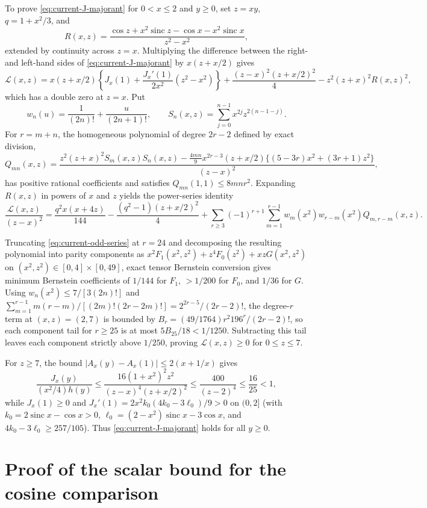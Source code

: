 \documentclass[11pt]{article}
\numberwithin{equation}{section}
\theoremstyle{remark}
\DeclareMathOperator{\sinc}{sinc}
\begin{document}
To prove \eqref{eq:current-J-majorant} for $0<x\le2$ and $y\ge0$, set $z=xy$,
$q=1+x^2/3$, and
\[
 R(x,z)=\frac{\cos z+x^2\sinc z-\cos x-x^2\sinc x}{z^2-x^2},
\]
extended by continuity across $z=x$. Multiplying the difference between the
right- and left-hand sides of \eqref{eq:current-J-majorant} by $x(z+x/2)$ gives
\[
 \mathcal L(x,z)=x(z+x/2)\left\{J_x(1)
       +\frac{J_x'(1)}{2x^2}(z^2-x^2)\right\}
       +\frac{(z-x)^2(z+x/2)^2}{4}
       -z^2(z+x)^2R(x,z)^2,
\]
which has a double zero at $z=x$. Put
\[
 w_n(u)=\frac1{(2n)!}+\frac{u}{(2n+1)!},\qquad
 S_n(x,z)=\sum_{j=0}^{n-1}x^{2j}z^{2(n-1-j)}.
\]
For $r=m+n$, the homogeneous polynomial of degree $2r-2$ defined by exact
division,
\[
 Q_{mn}(x,z)=\frac{
 z^2(z+x)^2S_m(x,z)S_n(x,z)
 -\frac{4mn}{9}x^{2r-3}(z+x/2)
        \{(5-3r)x^2+(3r+1)z^2\}}{(z-x)^2},
\]
has positive rational coefficients and satisfies $Q_{mn}(1,1)\le8mnr^2$.
Expanding $R(x,z)$ in powers of $x$ and $z$ yields the power-series identity
\begin{equation}\label{eq:current-odd-series}
 \frac{\mathcal L(x,z)}{(z-x)^2}
 =\frac{q^2x(x+4z)}{144}
   -\frac{(q^2-1)(z+x/2)^2}{4}
   +\sum_{r\ge3}(-1)^{r+1}
       \sum_{m=1}^{r-1}w_m(x^2)w_{r-m}(x^2)Q_{m,r-m}(x,z).
\end{equation}

Truncating \eqref{eq:current-odd-series} at $r=24$ and decomposing the
resulting polynomial into parity components as
$x^2F_1(x^2,z^2)+z^4F_0(z^2)+xzG(x^2,z^2)$ on $(x^2,z^2)\in[0,4]\times[0,49]$,
exact tensor Bernstein conversion gives minimum Bernstein coefficients of
$1/144$ for $F_1$, $>1/200$ for $F_0$, and $1/36$ for $G$. Using
$w_n(x^2)\le7/[3(2n)!]$ and $\sum_{m=1}^{r-1}m(r-m)/[(2m)!(2r-2m)!]=2^{2r-5}/(2r-2)!$,
the degree-$r$ term at $(x,z)=(2,7)$ is bounded by
$B_r=(49/1764)r^2 196^r/(2r-2)!$, so each component tail for $r\ge25$ is at
most $5B_{25}/18<1/1250$. Subtracting this tail leaves each component
strictly above $1/250$, proving $\mathcal L(x,z)\ge0$ for $0\le z\le7$.

For $z\ge7$, the bound $|A_x(y)-A_x(1)|\le2(x+1/x)$ gives
\[
 \frac{J_x(y)}{(x^2/4)h(y)}
 \le\frac{16(1+x^2)^2z^2}{(z-x)^4(z+x/2)^2}
 \le\frac{400}{(z-2)^4}\le\frac{16}{25}<1,
\]
while $J_x(1)\ge0$ and $J_x'(1)=2x^2k_0(4k_0-3\ell_0)/9>0$ on $(0,2]$
(with $k_0=2\sinc x-\cos x>0$, $\ell_0=(2-x^2)\sinc x-3\cos x$, and
$4k_0-3\ell_0\ge257/105$). Thus
\eqref{eq:current-J-majorant} holds for all $y\ge0$.

\section{Proof of the scalar bound for the cosine comparison}\label{sec:current-energy-cert}
\end{document}
